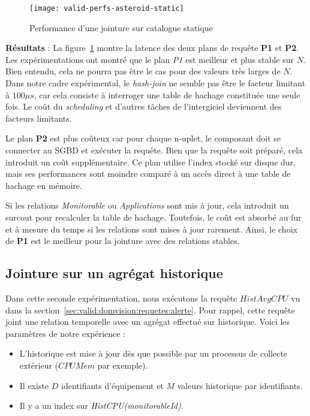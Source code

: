 \begin{figure}[ht]
	\centering
	\texttt{[image: valid-perfs-asteroid-static]}
	\caption{Performance d'une jointure sur catalogue statique}\label{fig:valid:perfs:asteroid:static}
\end{figure}

\textbf{Résultats} : La figure~\ref{fig:valid:perfs:asteroid:static} montre la latence des deux plans de requête \textbf{P1} et \textbf{P2}. Les expérimentations ont montré que le plan \textit{P1} est meilleur et plus stable sur $N$. Bien entendu, cela ne pourra pas être le cas pour des valeurs très larges de $N$. Dans notre cadre expérimental, le \textit{hash-join} ne semble pas être le facteur limitant à $100\mu s$, car cela consiste à interroger une table de hachage constituée une seule fois. Le coût du \textit{scheduling} et d'autres tâches de l'intergiciel deviennent des facteurs limitants. 

Le plan \textbf{P2} est plus coûteux car pour chaque n-uplet, le composant doit se connecter au SGBD et exécuter la requête. Bien que la requête soit préparé, cela introduit un coût supplémentaire. Ce plan utilise l'index stocké sur disque dur, mais ses performances sont moindre comparé à un accès direct à une table de hachage en mémoire.

Si les relations \textit{Monitorable} ou \textit{Applications} sont mis à jour, cela introduit un surcout pour recalculer la table de hachage. Toutefois, le coût est absorbé au fur et à mesure du temps si les relations sont mises à jour rarement. Ainsi, le choix de \textbf{P1} est le meilleur pour la jointure avec des relations stables.

\subsection{Jointure sur un agrégat historique}
Dans cette seconde expérimentation, nous exécutons la requête $HistAvgCPU$ vu dans la section~\ref{sec:valid:domvision:requetes:alerte}. Pour rappel, cette requête joint une relation temporelle avec un agrégat effectué sur historique. Voici les paramètres de notre expérience :
\begin{itemize}
	\item L'historique est mise à jour dès que possible par un processus de collecte extérieur ($CPUMem$ par exemple).
	\item Il existe $D$ identifiants d'équipement et $M$ valeurs historique par identifiants.
	\item Il y a un index sur \textit{HistCPU(monitorableId)}.
\end{itemize}


